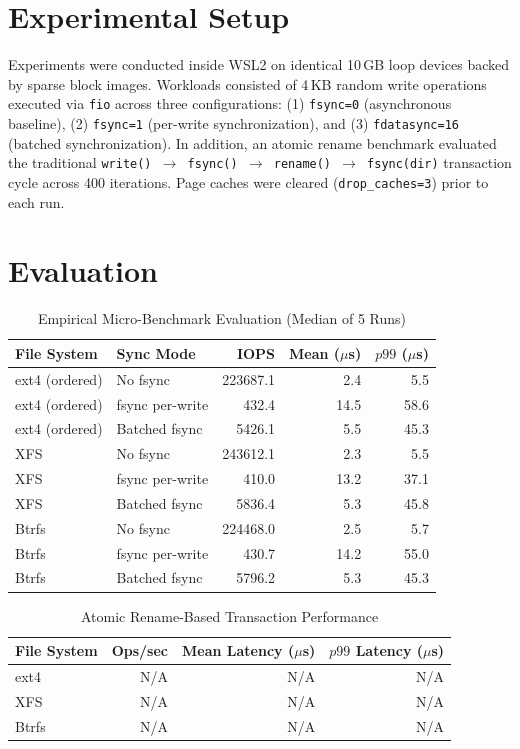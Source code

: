 \documentclass[conference]{IEEEtran}
\begin{document}
\section{Experimental Setup}
Experiments were conducted inside WSL2 on identical 10\,GB loop devices backed by sparse block images. Workloads consisted of 4\,KB random write operations executed via \texttt{fio} across three configurations: (1) \texttt{fsync=0} (asynchronous baseline), (2) \texttt{fsync=1} (per-write synchronization), and (3) \texttt{fdatasync=16} (batched synchronization). In addition, an atomic rename benchmark evaluated the traditional \texttt{write() $\rightarrow$ fsync() $\rightarrow$ rename() $\rightarrow$ fsync(dir)} transaction cycle across 400 iterations. Page caches were cleared (\texttt{drop\_caches=3}) prior to each run.

\section{Evaluation}

\begin{table}[htbp]
\caption{Empirical Micro-Benchmark Evaluation (Median of 5 Runs)}
\label{tab:durability_matrix}
\centering
\begin{tabular}{llrrr}
\hline
\textbf{File System} & \textbf{Sync Mode} & \textbf{IOPS} & \textbf{Mean ($\mu$s)} & \textbf{$p99$ ($\mu$s)} \\
\hline
ext4 (ordered) & No fsync        & 223687.1 & 2.4 & 5.5 \\
ext4 (ordered) & fsync per-write & 432.4 & 14.5 & 58.6 \\
ext4 (ordered) & Batched fsync   & 5426.1 & 5.5 & 45.3 \\
\hline
XFS            & No fsync        & 243612.1 & 2.3 & 5.5 \\
XFS            & fsync per-write & 410.0 & 13.2 & 37.1 \\
XFS            & Batched fsync   & 5836.4 & 5.3 & 45.8 \\
\hline
Btrfs          & No fsync        & 224468.0 & 2.5 & 5.7 \\
Btrfs          & fsync per-write & 430.7 & 14.2 & 55.0 \\
Btrfs          & Batched fsync   & 5796.2 & 5.3 & 45.3 \\
\hline
\end{tabular}
\end{table}

\begin{table}[htbp]
\caption{Atomic Rename-Based Transaction Performance}
\label{tab:rename_eval}
\centering
\begin{tabular}{lrrr}
\hline
\textbf{File System} & \textbf{Ops/sec} & \textbf{Mean Latency ($\mu$s)} & \textbf{$p99$ Latency ($\mu$s)} \\
\hline
ext4  & N/A & N/A & N/A \\
XFS   & N/A & N/A & N/A \\
Btrfs & N/A & N/A & N/A \\
\hline
\end{tabular}
\end{table}
\end{document}
